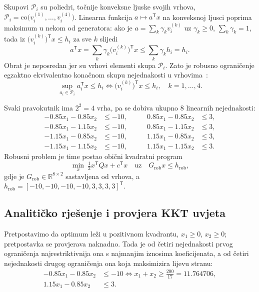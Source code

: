 Skupovi $\mathcal{P}_i$ su poliedri, točnije konveksne ljuske svojih vrhova, $\mathcal{P}_i = \mathrm{co}\big(v_i^{(1)}, \dots, v_i^{(4)}\big)$. Linearna funkcija $a \mapsto a^{\mathsf{T}} x$ na konveksnoj ljusci poprima maksimum u nekom od generatora: ako je $a = \sum_k \gamma_k v_i^{(k)}$ uz $\gamma_k \geq 0$, $\sum_k \gamma_k = 1$, tada iz $\big(v_i^{(k)}\big)^{\mathsf{T}} x \leq h_i$ za sve $k$ slijedi
\begin{equation}
a^{\mathsf{T}} x = \sum_k \gamma_k \big(v_i^{(k)}\big)^{\mathsf{T}} x \leq \sum_k \gamma_k h_i = h_i .
\end{equation}
Obrat je neposredan jer su vrhovi elementi skupa $\mathcal{P}_i$. Zato je robusno ograničenje egzaktno ekvivalentno konačnom skupu nejednakosti u vrhovima~\cite[str.~13--14]{jokic2025robusno}:
\begin{equation}
\sup_{a_i \in \mathcal{P}_i} a_i^{\mathsf{T}} x \leq h_i
\iff
\big(v_i^{(k)}\big)^{\mathsf{T}} x \leq h_i, \quad k = 1, \dots, 4.
\end{equation}

Svaki pravokutnik ima $2^2 = 4$ vrha, pa se dobiva ukupno $8$ linearnih nejednakosti:
\begin{equation}
\begin{aligned}
-0.85 x_1 - 0.85 x_2 &\leq -10, &\qquad 0.85 x_1 - 0.85 x_2 &\leq 3, \\
-0.85 x_1 - 1.15 x_2 &\leq -10, &\qquad 0.85 x_1 - 1.15 x_2 &\leq 3, \\
-1.15 x_1 - 0.85 x_2 &\leq -10, &\qquad 1.15 x_1 - 0.85 x_2 &\leq 3, \\
-1.15 x_1 - 1.15 x_2 &\leq -10, &\qquad 1.15 x_1 - 1.15 x_2 &\leq 3.
\end{aligned}
\label{eq:rob_osam}
\end{equation}
Robusni problem je time postao obični kvadratni program
\begin{equation}
\min_{x} \ \tfrac{1}{2} x^{\mathsf{T}} Q x + c^{\mathsf{T}} x \quad \text{uz} \quad G_{\mathrm{rob}} x \leq h_{\mathrm{rob}},
\label{eq:rob_qp}
\end{equation}
gdje je $G_{\mathrm{rob}} \in \mathbb{R}^{8 \times 2}$ sastavljena od vrhova, a $h_{\mathrm{rob}} = [-10, -10, -10, -10, 3, 3, 3, 3]^{\mathsf{T}}$.

\subsection{Analitičko rješenje i provjera KKT uvjeta}

Pretpostavimo da optimum leži u pozitivnom kvadrantu, $x_1 \geq 0$, $x_2 \geq 0$; pretpostavka se provjerava naknadno. Tada je od četiri nejednakosti prvog ograničenja najrestriktivnija ona s najmanjim iznosima koeficijenata, a od četiri nejednakosti drugog ograničenja ona koja maksimizira lijevu stranu:
\begin{align}
-0.85 x_1 - 0.85 x_2 &\leq -10 \iff x_1 + x_2 \geq \frac{200}{17} = 11.764706, \label{eq:rob_wc1} \\
1.15 x_1 - 0.85 x_2 &\leq 3. \label{eq:rob_wc2}
\end{align}

